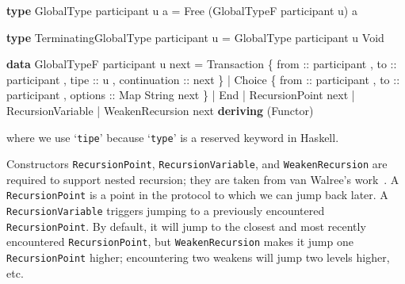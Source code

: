 \documentclass[runningheads,plain]{llncs}
\newenvironment{Shaded}{}{}
\newcommand{\KeywordTok}[1]{\textcolor[rgb]{0.00,0.44,0.13}{\textbf{#1}}}
\newcommand{\DataTypeTok}[1]{\textcolor[rgb]{0.56,0.13,0.00}{#1}}
\newcommand{\OtherTok}[1]{\textcolor[rgb]{0.00,0.44,0.13}{#1}}
\newcommand{\FunctionTok}[1]{\textcolor[rgb]{0.02,0.16,0.49}{#1}}
\newcommand{\NormalTok}[1]{#1}
\begin{document}
\begin{Shaded}
\begin{Highlighting}[]
\KeywordTok{type} \DataTypeTok{GlobalType}\NormalTok{ participant u a }\FunctionTok{=} 
    \DataTypeTok{Free}\NormalTok{ (}\DataTypeTok{GlobalTypeF}\NormalTok{ participant u) a }

\KeywordTok{type} \DataTypeTok{TerminatingGlobalType}\NormalTok{ participant u }\FunctionTok{=} 
    \DataTypeTok{GlobalType}\NormalTok{ participant u }\DataTypeTok{Void}

\KeywordTok{data} \DataTypeTok{GlobalTypeF}\NormalTok{ participant u next}
    \FunctionTok{=} \DataTypeTok{Transaction} 
\NormalTok{        \{}\OtherTok{ from ::}\NormalTok{ participant}
\NormalTok{        ,}\OtherTok{ to ::}\NormalTok{ participant}
\NormalTok{        ,}\OtherTok{ tipe ::}\NormalTok{ u}
\NormalTok{        ,}\OtherTok{ continuation ::}\NormalTok{  next }
\NormalTok{        \} }
    \FunctionTok{|} \DataTypeTok{Choice} 
\NormalTok{        \{}\OtherTok{ from ::}\NormalTok{ participant}
\NormalTok{        ,}\OtherTok{ to ::}\NormalTok{ participant}
\NormalTok{        ,}\OtherTok{ options ::} \DataTypeTok{Map} \DataTypeTok{String}\NormalTok{ next }
\NormalTok{        \}}
    \FunctionTok{|} \DataTypeTok{End}
    \FunctionTok{|} \DataTypeTok{RecursionPoint}\NormalTok{ next}
    \FunctionTok{|} \DataTypeTok{RecursionVariable}
    \FunctionTok{|} \DataTypeTok{WeakenRecursion}\NormalTok{ next}
    \KeywordTok{deriving}\NormalTok{ (}\DataTypeTok{Functor}\NormalTok{)}
\end{Highlighting}
\end{Shaded}


\noindent where we use `\texttt{tipe}' because `\texttt{type}' is a reserved keyword in Haskell. 

Constructors \texttt{RecursionPoint}, \texttt{RecursionVariable}, and  \texttt{WeakenRecursion} are required to support nested
recursion; they are taken from van Walree's work~\cite{van2017session}. A
\texttt{RecursionPoint} is a point in the protocol to which we can 
jump back later. A \texttt{RecursionVariable} triggers jumping to a
previously encountered \texttt{RecursionPoint}. By default, it will jump
to the closest and most recently encountered \texttt{RecursionPoint},
but \texttt{WeakenRecursion} makes it jump one \texttt{RecursionPoint}
higher; encountering two weakens will jump two levels higher, etc.
\end{document}
